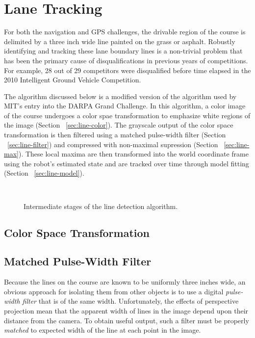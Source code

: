 \documentclass[11pt,twocolumn]{article}
\begin{document}
\section{Lane Tracking}
\label{sec:line}
For both the navigation and GPS challenges, the drivable region of the course
is delimited by a three inch wide line painted on the grass or asphalt.
Robustly identifying and tracking these lane boundary lines is a non-trivial
problem that has been the primary cause of disqualifications in previous years
of competitions. For example, 28 out of 29 competitors were disqualified before
time elapsed in the 2010 Intelligent Ground Vehicle Competition.

The algorithm discussed below is a modified version of the algorithm used by
MIT's entry into the DARPA Grand Challenge. In this algorithm, a color image
of the course undergoes a color spae transformation to emphasize white regions
of the image (Section ~\ref{sec:line-color}). The grayscale output of the color
space transformation is then filtered using a matched pulse-width filter
(Section ~\ref{sec:line-filter}) and compressed with non-maximal supression
(Section ~\ref{sec:line-max}). These local maxima are then transformed into
the world coordinate frame using the robot's estimated state and are tracked
over time through model fitting (Section ~\ref{sec:line-model}).

\begin{figure*}
	\\
	\caption{Intermediate stages of the line detection algorithm.}
	\label{fig:lane-all}
\end{figure*}

\subsection{Color Space Transformation}


\subsection{Matched Pulse-Width Filter}
Because the lines on the course are known to be uniformly three inches wide, an
obvious approach for isolating them from other objects is to use a digital
\textit{pulse-width filter} that is of the same width. Unfortunately, the
effects of perspective projection mean that the apparent width of lines in the
image depend upon their distance from the camera. To obtain useful output, such
a filter must be properly \textit{matched} to expected width of the line at
each point in the image.
\end{document}
